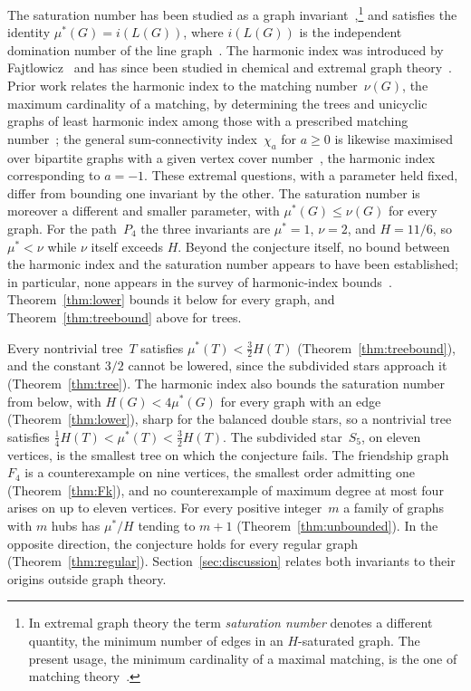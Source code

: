 \documentclass[11pt]{article}
\theoremstyle{definition}
\theoremstyle{remark}
\newcommand{\mustar}{\mu^{*}}
\begin{document}
The saturation
number has been studied as a graph
invariant~\cite{Alikhani2017saturation},\footnote{In extremal graph theory the
term \emph{saturation number} denotes a different quantity, the minimum number
of edges in an $H$-saturated graph. The present usage, the minimum cardinality
of a maximal matching, is the one of matching
theory~\cite{Alikhani2017saturation, Ahmadi2017saturation,
TavakoliDoslic2023smm}.}
and satisfies the identity $\mustar(G) = i(L(G))$, where $i(L(G))$ is the
independent domination number of the line
graph~\cite{Davila2025reverie, TavakoliDoslic2023smm}.  The harmonic index was
introduced by Fajtlowicz~\cite{Fajtlowicz1987harmonic} and has since been
studied in chemical and extremal graph
theory~\cite{Zhong2012harmonic, Ilic2012note}.  Prior work relates the harmonic
index to the
matching number~$\nu(G)$, the maximum cardinality of a matching, by
determining the trees and unicyclic graphs of least harmonic index among those
with a prescribed matching number~\cite{Lv2014trees, Lv2014unicyclic}; the
general sum-connectivity index~$\chi_a$ for $a \ge 0$ is likewise maximised over
bipartite graphs with a given vertex cover number~\cite{Vetrik2023general}, the harmonic
index corresponding to $a = -1$.  These extremal questions, with a parameter
held fixed, differ from bounding one invariant by the other.  The saturation
number is moreover a different and smaller parameter, with
$\mustar(G) \le \nu(G)$ for every graph.  For the
path~$P_4$ the three invariants are $\mustar = 1$, $\nu = 2$, and $H = 11/6$,
so $\mustar < \nu$ while $\nu$ itself exceeds $H$.  Beyond the conjecture
itself, no bound between the harmonic index and the saturation number
appears to have been established; in particular, none appears in the survey of
harmonic-index bounds~\cite{AliZhongGutman2019harmonic}.
Theorem~\ref{thm:lower} bounds it below for every graph, and
Theorem~\ref{thm:treebound} above for trees.

Every nontrivial tree~$T$ satisfies
$\mustar(T) < \tfrac{3}{2} H(T)$ (Theorem~\ref{thm:treebound}), and the constant
$3/2$ cannot be lowered, since the subdivided stars approach it (Theorem~\ref{thm:tree}).
The harmonic index also bounds the saturation number from below, with
$H(G) < 4\mustar(G)$ for every graph with an edge (Theorem~\ref{thm:lower}),
sharp for the balanced double stars, so a nontrivial tree satisfies
$\tfrac14 H(T) < \mustar(T) < \tfrac{3}{2} H(T)$.
The subdivided star~$S_5$, on eleven vertices, is the smallest tree on which the
conjecture fails.  The friendship graph~$F_4$ is a counterexample on nine
vertices, the smallest order admitting one (Theorem~\ref{thm:Fk}), and no
counterexample of maximum degree at most four arises on up to eleven vertices.
For every
positive integer~$m$ a family of graphs with $m$ hubs has $\mustar/H$ tending
to $m+1$ (Theorem~\ref{thm:unbounded}).  In the opposite direction, the
conjecture holds for every regular graph (Theorem~\ref{thm:regular}).
Section~\ref{sec:discussion} relates both invariants to their origins outside
graph theory.
\end{document}
